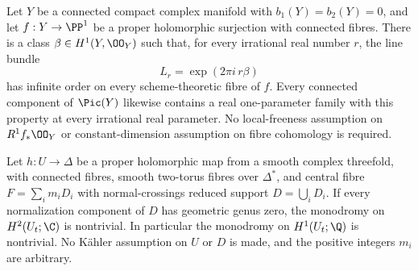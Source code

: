 \begin{proposition}\hypertarget{tag-01G7}{}\label{cdp:st:D.1.9}


Let $Y$ be a connected compact complex manifold with
$b_1(Y)=b_2(Y)=0$, and let $f:Y\to\PP^1$ be a proper
holomorphic surjection with connected fibres. There is a class
$\beta\in H^1(Y,\OO_Y)$ such that, for every irrational real number
$r$, the line bundle
\[
L_r=\exp(2\pi i\,r\beta)
\]
has infinite order on every scheme-theoretic fibre of $f$.
Every connected component of $\Pic(Y)$ likewise contains a real
one-parameter family with this property at every irrational real
parameter.
No local-freeness assumption on $R^1f_*\OO_Y$ or constant-dimension
assumption on fibre cohomology is required.
\end{proposition}

\begin{proposition}\hypertarget{tag-01GA}{}\label{cdp:st:D.2.3}



Let $h:U\to\Delta$ be a proper holomorphic map from a smooth
complex threefold, with connected fibres, smooth two-torus fibres
over $\Delta^*$, and central fibre $F=\sum_i m_iD_i$ with
normal-crossings reduced support $D=\bigcup_iD_i$.
If every normalization component of $D$ has geometric genus zero,
the monodromy on $H^2(U_t;\C)$ is nontrivial. In particular the
monodromy on $H^1(U_t;\Q)$ is nontrivial. No K\"ahler assumption
on $U$ or $D$ is made, and the positive integers $m_i$ are arbitrary.
\end{proposition}

